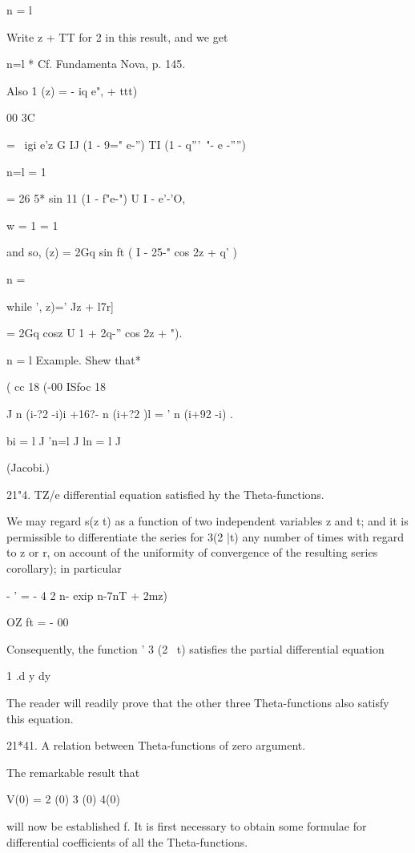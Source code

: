 n = l

Write z + TT for 2 in this result, and we get


n=l * Cf. Fundamenta Nova, p. 145.

%
%

Also 1 (z) = - iq e", + ttt)

00 3C

= \ igi e'z G IJ (1 - 9=" e-'') TI (1 - q'''~"- e -'''')

n=l = 1

= 26 5* sin 11 (1 - f"e-") U I - e'-'O,

w = 1 = 1

and so, (z) = 2Gq sin ft ( I - 25-" cos 2z + q' )

n = \

while ', z)=' Jz + l7r]

= 2Gq cosz U 1 + 2q-'' cos 2z + ").

n = l Example. Shew that*

( cc 18 (-00 ISfoc 18

J n (i-?2 -i)i +16?- n (i+?2 )l = ' n (i+92 -i) .

bi = l J 'n=l J ln = l J

(Jacobi.)

21"4. TZ/e differential equation satisfied hy the Theta-functions.

We may regard s(z t) as a function of two independent variables z and
t; and it is permissible to differentiate the series for 3(2 |t) any
number of times with regard to z or r, on account of the uniformity of
convergence of the resulting series  corollary); in particular

- ' = - 4 2 n- exip n-7nT + 2mz)

OZ ft = - 00

Consequently, the function ' 3 (2 \ t) satisfies the partial
differential equation

1 .d y dy

The reader will readily prove that the other three Theta-functions
also satisfy this equation.

21*41. A relation between Theta-functions of zero argument.

The remarkable result that

V(0) = 2 (0) 3 (0) 4(0)

will now be established f. It is first necessary to obtain some
formulae for differential coefficients of all the Theta-functions.

